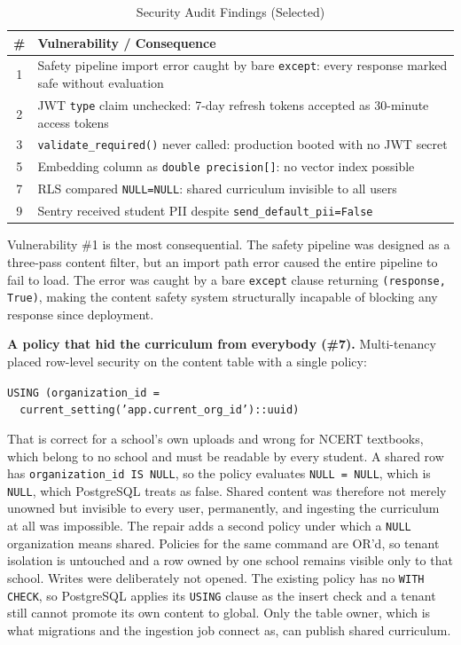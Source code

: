 \begin{table}
\caption{Security Audit Findings (Selected)}
\label{tab:security}
\centering
\begin{tabular}{@{}cp{5.5cm}@{}}
\toprule
\textbf{\#} & \textbf{Vulnerability / Consequence} \\
\midrule
1 & Safety pipeline import error caught by bare \texttt{except}: every response marked safe without evaluation \\
2 & JWT \texttt{type} claim unchecked: 7-day refresh tokens accepted as 30-minute access tokens \\
3 & \texttt{validate\_required()} never called: production booted with no JWT secret \\
5 & Embedding column as \texttt{double precision[]}: no vector index possible \\
7 & RLS compared \texttt{NULL=NULL}: shared curriculum invisible to all users \\
9 & Sentry received student PII despite \texttt{send\_default\_pii=False} \\
\bottomrule
\end{tabular}
\end{table}

Vulnerability \#1 is the most consequential. The safety pipeline was designed as a three-pass content filter, but an import path error caused the entire pipeline to fail to load. The error was caught by a bare \texttt{except} clause returning \texttt{(response, True)}, making the content safety system structurally incapable of blocking any response since deployment.

\textbf{A policy that hid the curriculum from everybody (\#7).} Multi-tenancy placed row-level security on the content table with a single policy:

\begin{center}\footnotesize
\texttt{USING (organization\_id =}\\
\texttt{~~current\_setting('app.current\_org\_id')::uuid)}
\end{center}

That is correct for a school's own uploads and wrong for NCERT textbooks, which belong to no school and must be readable by every student. A shared row has \texttt{organization\_id IS NULL}, so the policy evaluates \texttt{NULL = NULL}, which is \texttt{NULL}, which PostgreSQL treats as false. Shared content was therefore not merely unowned but invisible to every user, permanently, and ingesting the curriculum at all was impossible. The repair adds a second policy under which a \texttt{NULL} organization means shared. Policies for the same command are OR'd, so tenant isolation is untouched and a row owned by one school remains visible only to that school. Writes were deliberately not opened. The existing policy has no \texttt{WITH CHECK}, so PostgreSQL applies its \texttt{USING} clause as the insert check and a tenant still cannot promote its own content to global. Only the table owner, which is what migrations and the ingestion job connect as, can publish shared curriculum.

